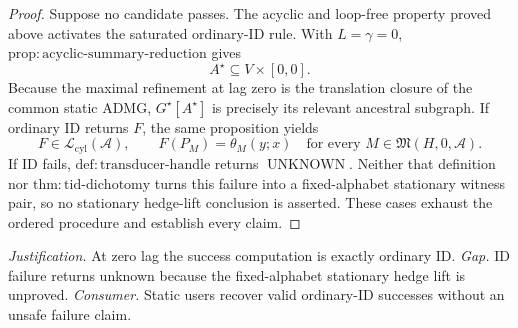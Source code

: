 \documentclass{article}
\begin{document}
\begin{proof}
Suppose no candidate passes.  The acyclic and loop-free property proved above activates the saturated ordinary-ID rule.  With \(L=\gamma=0\), \(\mathrm{prop:acyclic\text{-}summary\text{-}reduction}\) gives
\[
A^\star\subseteq V\times[0,0].
\]
Because the maximal refinement at lag zero is the translation closure of the common static ADMG, \(G^\star[A^\star]\) is precisely its relevant ancestral subgraph.  If ordinary ID returns \(F\), the same proposition yields
\[
F\in\mathcal L_{\mathrm{cyl}}(\mathcal A),
\qquad
F(P_M)=\theta_M(y;x)
\quad
\text{for every }M\in\mathfrak M(H,0,\mathcal A).
\]
If ID fails, \(\mathrm{def:transducer\text{-}handle}\) returns \(\operatorname{UNKNOWN}\).  Neither that definition nor \(\mathrm{thm:tid\text{-}dichotomy}\) turns this failure into a fixed-alphabet stationary witness pair, so no stationary hedge-lift conclusion is asserted.  These cases exhaust the ordered procedure and establish every claim.
\end{proof}
\par\smallskip\noindent \textit{Justification.} At zero lag the success computation is exactly ordinary ID. \textit{Gap.} ID failure returns unknown because the fixed-alphabet stationary hedge lift is unproved. \textit{Consumer.} Static users recover valid ordinary-ID successes without an unsafe failure claim.
\end{document}
